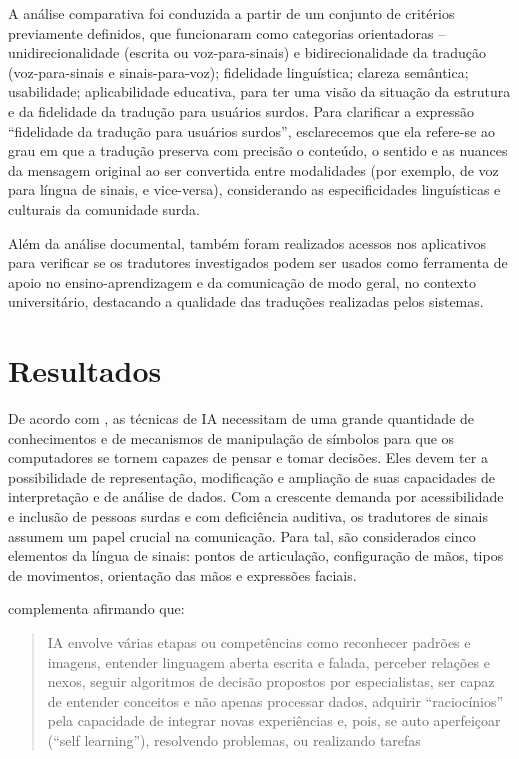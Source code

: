 \documentclass[portuguese]{textolivre}
\begin{document}
A análise comparativa foi conduzida a partir de um conjunto de critérios previamente definidos, que funcionaram como categorias orientadoras – unidirecionalidade (escrita ou voz-para-sinais) e bidirecionalidade da tradução (voz-para-sinais e sinais-para-voz); fidelidade linguística; clareza semântica; usabilidade; aplicabilidade educativa, para ter uma visão da situação da estrutura e da fidelidade da tradução para usuários surdos. Para clarificar a expressão “fidelidade da tradução para usuários surdos”, esclarecemos que ela refere-se ao grau em que a tradução preserva com precisão o conteúdo, o sentido e as nuances da mensagem original ao ser convertida entre modalidades (por exemplo, de voz para língua de sinais, e vice-versa), considerando as especificidades linguísticas e culturais da comunidade surda.

Além da análise documental, também foram realizados acessos nos aplicativos para verificar se os tradutores investigados podem ser usados como ferramenta de apoio no ensino-aprendizagem e da comunicação de modo geral, no contexto universitário, destacando a qualidade das traduções realizadas pelos sistemas. 

\section{Resultados}

De acordo com \textcite{Santos2018}, as técnicas de IA necessitam de uma grande quantidade de conhecimentos e de mecanismos de manipulação de símbolos para que os computadores se tornem capazes de pensar e tomar decisões. Eles devem ter a possibilidade de representação, modificação e ampliação de suas capacidades de interpretação e de análise de dados. Com a crescente demanda por acessibilidade e inclusão de pessoas surdas e com deficiência auditiva, os tradutores de sinais assumem um papel crucial na comunicação. Para tal, são considerados cinco elementos da língua de sinais: pontos de articulação, configuração de mãos, tipos de movimentos, orientação das mãos e expressões faciais.

\textcite{Lobo2017} complementa afirmando que: 

\begin{quote}
    IA envolve várias etapas ou competências como reconhecer padrões e imagens, entender linguagem aberta escrita e falada, perceber relações e nexos, seguir algoritmos de decisão propostos por especialistas, ser capaz de entender conceitos e não apenas processar dados, adquirir “raciocínios” pela capacidade de integrar novas experiências e, pois, se auto aperfeiçoar (“self learning”), resolvendo problemas, ou realizando tarefas \cite[p. 189]{Lobo2017}
\end{quote}
\end{document}
